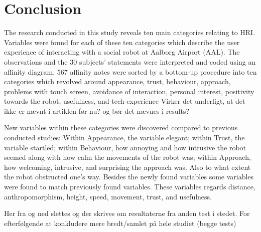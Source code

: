 \section{Conclusion}
\label{Conclusion}
%
The research conducted in this study reveals ten main categories relating to HRI. Variables were found for each of these ten categories which describe the user experience of interacting with a social robot at Aalborg Airport (AAL). The observations and the 30 subjects' statements were interpreted and coded using an affinity diagram. 567 affinity notes were sorted by a bottom-up procedure into ten categories which revolved around appearance, trust, behaviour, approach, problems with touch screen, avoidance of interaction, personal interest, positivity towards the robot, usefulness, and tech-experience {\color{red} Virker det underligt, at det ikke er nævnt i artiklen før nu? og bør det nævnes i results?}

New variables within these categories were discovered compared to previous conducted studies: Within Appearance, the variable elegant; within Trust, the variable startled; within Behaviour, how annoying and how intrusive the robot seemed along with how calm the movements of the robot was; within Approach, how welcoming, intrusive, and surprising the approach was. Also to what extent the robot obstructed one's way. Besides the newly found variables some variables were found to match previously found variables. These variables regards distance, anthropomorphism, height, speed, movement, trust, and usefulness.

{\color{red} Her fra og ned slettes og der skrives om resultaterne fra anden test i stedet. For efterfølgende at konkludere mere bredt/samlet på hele studiet (begge tests)}


